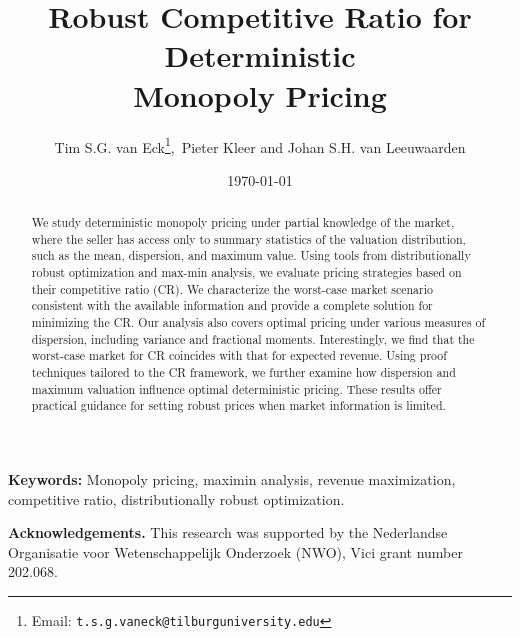 \documentclass[11pt]{article}
\title{Robust Competitive Ratio for Deterministic\\ Monopoly Pricing}
\author{
Tim S.G. van Eck\footnote{Email: \texttt{t.s.g.vaneck@tilburguniversity.edu}},\
Pieter Kleer
{\rm and}  Johan S.H. van Leeuwaarden
}
\affil{Department of Econometrics and Operations Research, Tilburg University}
\date{\today}
\newcommand{\1}{\mathds{1}}
\begin{document}
\maketitle

\begin{abstract}
We study deterministic monopoly pricing under partial knowledge of the market, where the seller has access only to summary statistics of the valuation distribution, such as the mean, dispersion, and maximum value. Using tools from distributionally robust optimization and max-min analysis, we evaluate pricing strategies based on their competitive ratio (CR). We characterize the worst-case market scenario consistent with the available information and provide a complete solution for minimizing the CR. Our analysis also covers optimal pricing under various measures of dispersion, including variance and fractional moments. Interestingly, we find that the worst-case market for CR coincides with that for expected revenue. Using proof techniques tailored to the CR framework, we further examine how dispersion and maximum valuation influence optimal deterministic pricing. These results offer practical guidance for setting robust prices when market information is limited.
\end{abstract}

\medskip
\noindent\textbf{Keywords:}
 Monopoly pricing, maximin analysis, revenue maximization, competitive ratio, distributionally robust optimization.

\bigskip
\noindent\textbf{Acknowledgements.} This research was supported by the Nederlandse Organisatie voor Wetenschappelijk Onderzoek (NWO), Vici grant number 202.068.
\end{document}
